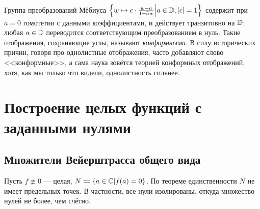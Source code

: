 \documentclass[a4paper]{report}
\begin{document}
    Группа преобразований Мёбиуса $\left\{w \mapsto c \cdot \frac{w - a}{1 - \overline{a}w}\middle|a \in \mathbb{D}, |c| = 1\right\}$ содержит при $a = 0$ гомотетии с данными коэффициентами, и действует транзитивно на $\mathbb{D}$: любая $a \in \mathbb{D}$ переводится соответствующим преобразованием в нуль.
    Такие отображения, сохраняющие углы, называют \emph{конформными}.
    В силу исторических причин, говоря про однолистные отображения, часто добавляют слово <<конформные>>, а сама наука зовётся теорией конформных отображений, хотя, как мы только что видели, однолистность сильнее.
    \section{Построение целых функций с заданными нулями}
    \subsection{Множители Вейерштрасса общего вида}
    Пусть $f \not\equiv 0$ --- целая, $N \coloneqq \left\{a \in \mathbb{C}\middle|f(a) = 0\right\}$.
    По теореме единственности $N$ не имеет предельных точек.
    В частности, все нули изолированы, откуда множество нулей не более, чем счётно.
\end{document}
